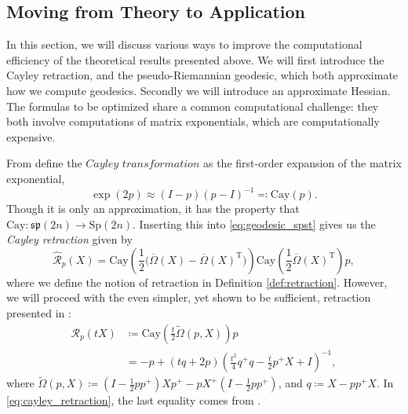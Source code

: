 \subsection{Moving from Theory to Application}\label{sec:theory_to_application}
In this section, we will discuss various ways to improve the computational efficiency of the theoretical results presented above. We will first introduce the Cayley retraction, and the pseudo-Riemannian geodesic, which both approximate how we compute geodesics. Secondly we will introduce an approximate Hessian. The formulas to be optimized share a common computational challenge: they both involve computations of matrix exponentials, which are computationally expensive. 

From \cite[p.~7]{JensenZimmermann2024} define the $\textit{Cayley transformation}$ as the first-order expansion of the matrix exponential,
%
\begin{equation*}
\exp(2p)\approx(I-p)(p-I)^{-1}\eqqcolon\mathrm{Cay}(p).
\end{equation*}
%
Though it is only an approximation, it has the property that $\mathrm{Cay}\colon\mathfrak{sp}(2n)\to \mathrm{Sp}(2n)$. Inserting this into \eqref{eq:geodesic_spst} gives us the \textit{Cayley retraction} given by
%
\begin{equation*}
\hat{\mathcal{R}}_{p}(X)=\mathrm{Cay}\left( \frac{1}{2}\big(\overline{\Omega}(X)-\overline{\Omega}(X)^{\mathrm{T}}\big) \right)\mathrm{Cay}\left( \frac{1}{2}\overline{\Omega}(X)^{\mathrm{T}} \right)p,
\end{equation*}
where we define the notion of retraction in Definition \ref{def:retraction}. However, we will proceed with the even simpler, yet shown to be sufficient, retraction presented in \cite[p.~20]{BendokatZimmermann2021}:
%
\begin{equation}
    \label{eq:cayley_retraction}
    \begin{split}
        \mathcal{R}_{p}(tX)&\coloneqq\mathrm{Cay}\left( \frac{t}{2}\tilde{\Omega}(p,X) \right)p \\
        &=-p+(tq+2p)\left( \frac{t^{2}}{4}q^{+}q- \frac{t}{2}p^{+}X+I \right)^{-1},
    \end{split}
\end{equation}
%
where $\tilde{\Omega}(p,X)\coloneqq\left( I- \frac{1}{2}pp^{+} \right)Xp^{+}-pX^{+}\left( I- \frac{1}{2}pp^{+} \right)$, and $q\coloneqq X-pp^{+}X$. In \eqref{eq:cayley_retraction},  the last equality comes from \cite[Prop.~5.2]{BendokatZimmermann2021}.

